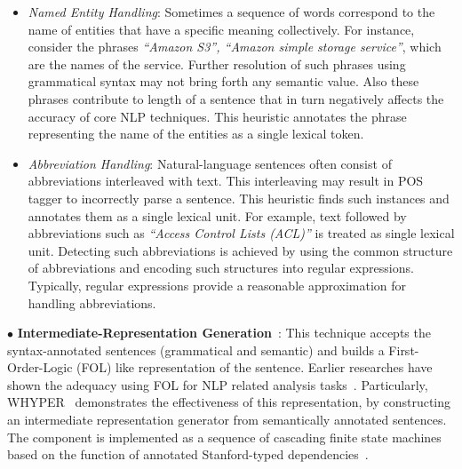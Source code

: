 \vspace*{-1.5ex}
\begin{itemize}

\item \textit{Named Entity Handling}: Sometimes a sequence of words correspond to the name of entities that have a specific meaning collectively.
For instance, consider the phrases \textit{``Amazon S3'', ``Amazon simple storage service''}, which are the names of the service.
Further resolution of such phrases using grammatical syntax may not bring forth any semantic value.
Also these phrases contribute to length of a sentence that in turn negatively affects the accuracy of core NLP techniques.
This heuristic annotates the phrase representing the name of the entities as a single lexical token.
	
\item \textit{Abbreviation Handling}: Natural-language sentences often consist of abbreviations interleaved with text.
This interleaving may result in POS tagger to incorrectly parse a sentence.
This heuristic finds such instances and annotates them as a single lexical unit.
For example, text followed by abbreviations such as \textit{``Access Control Lists (ACL)''} is treated as single lexical unit.
Detecting such abbreviations is achieved by using the common structure of abbreviations and encoding such structures into regular expressions.
Typically, regular expressions provide a reasonable approximation for handling abbreviations.  

\end{itemize}

{\small $\bullet$} \textbf{Intermediate-Representation Generation}~\cite{pandita13:WHYPER}:
This technique accepts the syntax-annotated sentences (grammatical and semantic) and builds a First-Order-Logic (FOL) like representation of the sentence.
Earlier researches have shown the adequacy using FOL for NLP related analysis tasks~\cite{Sinha2009,Sinha2010,pandita12:inferring}.
Particularly, WHYPER~\cite{pandita13:WHYPER} demonstrates the effectiveness of this representation, by constructing an intermediate representation generator from semantically annotated sentences. 
The component is implemented as a sequence of cascading finite state machines based on the function of annotated Stanford-typed dependencies~\cite{Marneffe06LREC,Marneffe08COLING,Klein03,KleinNIPS03}.
